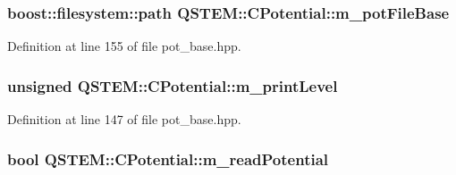 \hypertarget{class_q_s_t_e_m_1_1_c_potential_a6e79574bb82babb598c5f380dee5ac27}{
\subsubsection[{m\-\_\-pot\-File\-Base}]{\setlength{\rightskip}{0pt plus 5cm}boost\-::filesystem\-::path Q\-S\-T\-E\-M\-::\-C\-Potential\-::m\-\_\-pot\-File\-Base\hspace{0.3cm}{\ttfamily [protected]}}}\label{class_q_s_t_e_m_1_1_c_potential_a6e79574bb82babb598c5f380dee5ac27}


Definition at line 155 of file pot\-\_\-base.\-hpp.

\hypertarget{class_q_s_t_e_m_1_1_c_potential_a8dc6d423e7ed79a640be09d6d65b2daf}{
\subsubsection[{m\-\_\-print\-Level}]{\setlength{\rightskip}{0pt plus 5cm}unsigned Q\-S\-T\-E\-M\-::\-C\-Potential\-::m\-\_\-print\-Level\hspace{0.3cm}{\ttfamily [protected]}}}\label{class_q_s_t_e_m_1_1_c_potential_a8dc6d423e7ed79a640be09d6d65b2daf}


Definition at line 147 of file pot\-\_\-base.\-hpp.

\hypertarget{class_q_s_t_e_m_1_1_c_potential_a11f3741de38274974f1610db6c2b5a31}{
\subsubsection[{m\-\_\-read\-Potential}]{\setlength{\rightskip}{0pt plus 5cm}bool Q\-S\-T\-E\-M\-::\-C\-Potential\-::m\-\_\-read\-Potential\hspace{0.3cm}{\ttfamily [protected]}}}\label{class_q_s_t_e_m_1_1_c_potential_a11f3741de38274974f1610db6c2b5a31}


